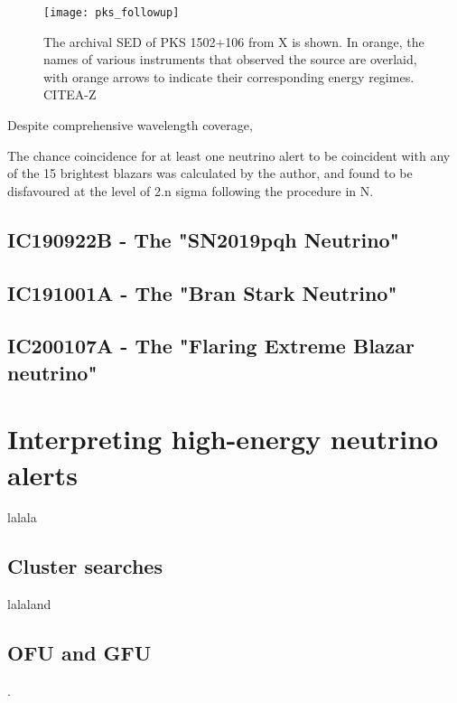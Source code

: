 \begin{figure}[!ht]
	\centering \texttt{[image: pks\_followup]}
	\caption{The archival SED of PKS 1502+106 from X is shown. In orange, the names of various instruments that observed the source are overlaid, with orange arrows to indicate their corresponding energy regimes. CITEA-Z}
	\label{fig:PKSobs}
\end{figure}

Despite comprehensive wavelength coverage, 

The chance coincidence for at least one neutrino alert to be coincident with any of the  15 brightest blazars was calculated by the author, and found to be disfavoured at the level of 2.n sigma following the procedure in N. 

\subsection{IC190922B - The "SN2019pqh Neutrino"}

\subsection{IC191001A - The "Bran Stark Neutrino"}

\subsection{IC200107A - The "Flaring Extreme Blazar neutrino"}

\section{Interpreting high-energy neutrino alerts}

lalala

\subsection{Cluster searches}
lalaland

\subsection{OFU and GFU}.